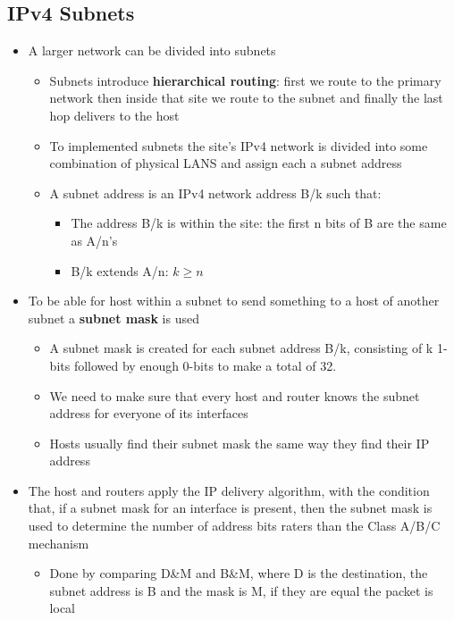 \documentclass[11pt]{article}
\providecommand{\tightlist}{%
      \setlength{\itemsep}{0pt}\setlength{\parskip}{0pt}}
\begin{document}
    \subsection{IPv4 Subnets}\label{ipv4-subnets}

\begin{itemize}
\tightlist
\item
  A larger network can be divided into subnets

  \begin{itemize}
  \tightlist
  \item
    Subnets introduce \textbf{hierarchical routing}: first we route to
    the primary network then inside that site we route to the subnet and
    finally the last hop delivers to the host
  \item
    To implemented subnets the site's IPv4 network is divided into some
    combination of physical LANS and assign each a subnet address
  \item
    A subnet address is an IPv4 network address B/k such that:

    \begin{itemize}
    \tightlist
    \item
      The address B/k is within the site: the first n bits of B are the
      same as A/n's
    \item
      B/k extends A/n: \(k \geq n\)
    \end{itemize}
  \end{itemize}
\item
  To be able for host within a subnet to send something to a host of
  another subnet a \textbf{subnet mask} is used

  \begin{itemize}
  \tightlist
  \item
    A subnet mask is created for each subnet address B/k, consisting of
    k 1-bits followed by enough 0-bits to make a total of 32.
  \item
    We need to make sure that every host and router knows the subnet
    address for everyone of its interfaces
  \item
    Hosts usually find their subnet mask the same way they find their IP
    address
  \end{itemize}
\item
  The host and routers apply the IP delivery algorithm, with the
  condition that, if a subnet mask for an interface is present, then the
  subnet mask is used to determine the number of address bits raters
  than the Class A/B/C mechanism

  \begin{itemize}
  \tightlist
  \item
    Done by comparing D\&M and B\&M, where D is the destination, the
    subnet address is B and the mask is M, if they are equal the packet
    is local
  \end{itemize}
\end{itemize}
\end{document}
